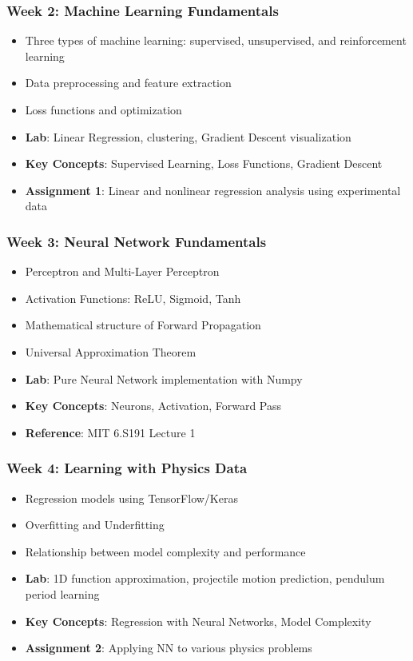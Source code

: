 \documentclass[11pt,a4paper]{article}
\begin{document}
\subsubsection*{Week 2: Machine Learning Fundamentals}
\begin{itemize}[noitemsep]
    \item Three types of machine learning: supervised, unsupervised, and reinforcement learning
    \item Data preprocessing and feature extraction
    \item Loss functions and optimization
    \item \textbf{Lab}: Linear Regression, clustering, Gradient Descent visualization
    \item \textbf{Key Concepts}: Supervised Learning, Loss Functions, Gradient Descent
    \item \textbf{Assignment 1}: Linear and nonlinear regression analysis using experimental data
\end{itemize}

\subsubsection*{Week 3: Neural Network Fundamentals}
\begin{itemize}[noitemsep]
    \item Perceptron and Multi-Layer Perceptron
    \item Activation Functions: ReLU, Sigmoid, Tanh
    \item Mathematical structure of Forward Propagation
    \item Universal Approximation Theorem
    \item \textbf{Lab}: Pure Neural Network implementation with Numpy
    \item \textbf{Key Concepts}: Neurons, Activation, Forward Pass
    \item \textbf{Reference}: MIT 6.S191 Lecture 1
\end{itemize}

\subsubsection*{Week 4: Learning with Physics Data}
\begin{itemize}[noitemsep]
    \item Regression models using TensorFlow/Keras
    \item Overfitting and Underfitting
    \item Relationship between model complexity and performance
    \item \textbf{Lab}: 1D function approximation, projectile motion prediction, pendulum period learning
    \item \textbf{Key Concepts}: Regression with Neural Networks, Model Complexity
    \item \textbf{Assignment 2}: Applying NN to various physics problems
\end{itemize}
\end{document}
